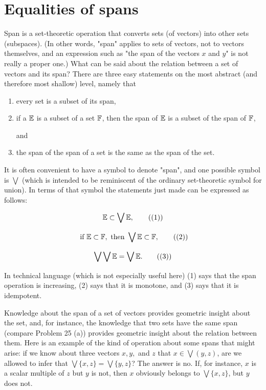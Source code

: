 \section{Equalities of spans}

Span is a set-theoretic operation that converts sets (of vectors) into other sets (subspaces). (In other words, "span" applies to sets of vectors, not to vectors themselves, and an expression such as "the span of the vectors $x$ and $y$" is not really a proper one.) What can be said about the relation between a set of vectors and its span? There are three easy statements on the most abstract (and therefore most shallow) level, namely that

\begin{enumerate}
    \item every set is a subset of its span,
    \item if a $\mathbb{E}$ is a subset of a set $\mathbb{F}$, then the span of $\mathbb{E}$ is a subset of the span of $\mathbb{F}$,

          and

    \item the span of the span of a set is the same as the span of the set.
\end{enumerate}

It is often convenient to have a symbol to denote "span", and one possible symbol is $\bigvee$ (which is intended to be reminiscent of the ordinary set-theoretic symbol for union). In terms of that symbol the statements just made can be expressed as follows:

\[
    \mathbb{E} \subset \bigvee \mathbb{E}, \tag{(1)}
\]

\[
    \text{ if } \mathbb{E} \subset \mathbb{F}, \text{ then } \bigvee \mathbb{E} \subset \mathbb{F}, \tag{(2)}
\]

\[
    \bigvee \bigvee \mathbb{E} = \bigvee \mathbb{E}. \tag{(3)}
\]

In technical language (which is not especially useful here) (1) says that the span operation is increasing, (2) says that it is monotone, and (3) says that it is idempotent.

Knowledge about the span of a set of vectors provides geometric insight about the set, and, for instance, the knowledge that two sets have the same span (compare Problem 25 (a)) provides geometric insight about the relation between them. Here is an example of the kind of operation about some spans that might arise: if we know about three vectors $x, y,$ and $z$ that $x \in \bigvee (y,z)$, are we allowed to infer that $\bigvee\{x,z\} = \bigvee \{y,z\}$? The answer is no. If, for instance, $x$ is a scalar multiple of $z$ but $y$ is not, then $x$ obviously belongs to $\bigvee \{x,z\}$, but $y$ does not.

